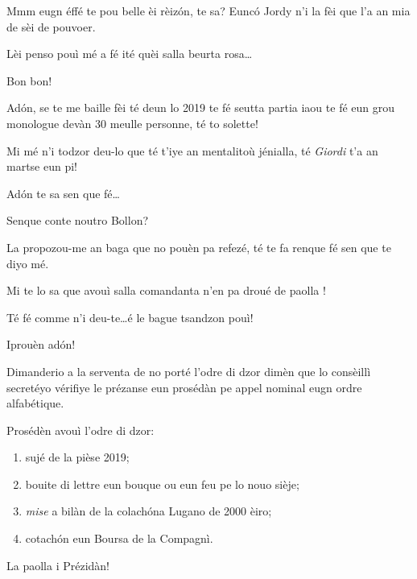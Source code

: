 \begin{drama}
\Secreteospeaks Mmm eugn éffé te pou belle èi rèiz\'on, te sa? Eunc\'o Jordy n'i la fèi que l’a an mia de sèi de pouvoer.

\Presidanspeaks {} Lèi penso pouì mé a fé ité quèi salla beurta rosa\ldots

\Secreteospeaks Bon bon!


\Jordyspeaks {} Ad\'on, se te me baille fèi té deun lo 2019 te fé seutta partia iaou te fé eun grou monologue devàn 30 meulle personne, té to solette!

\Cimaspeaks Mi mé n'i todzor deu-lo que té t'iye an mentalitoù jénialla, té \textit{Giordi} t’a an martse eun pi!

\Jordyspeaks Ad\'on te sa sen que fé\ldots


\Marcospeaks Senque conte noutro Bollon?

\Cimaspeaks La propozou-me an baga que no pouèn pa refezé, té te fa renque fé sen que te diyo mé.


\Sophiespeaks Mi te lo sa que avouì salla comandanta  n'en pa droué de paolla \quei!

\Jordyspeaks {} Té fé comme n'i deu-te\ldots é le bague tsandzon pouì!

\Sophiespeaks Iprouèn ad\'on!


\Presidanspeaks Dimanderio a la serventa de no porté l’odre di dzor dimèn que lo consèillì secretéyo vérifiye le prézanse eun prosédàn pe appel nominal eugn ordre alfabétique.


\Secreteospeaks Prosédèn avouì l’odre di dzor:
\begin{enumerate}
\item sujé de la pièse 2019;
\item bouite di lettre eun bouque ou eun feu pe lo nouo sièje;
\item \textit{mise} a bilàn de la \og colach\'on\fg a Lugano  de 2000 èiro; 
\item cotach\'on eun Boursa de la Compagnì.
\end{enumerate}
La paolla i Prézidàn!


\end{drama}
